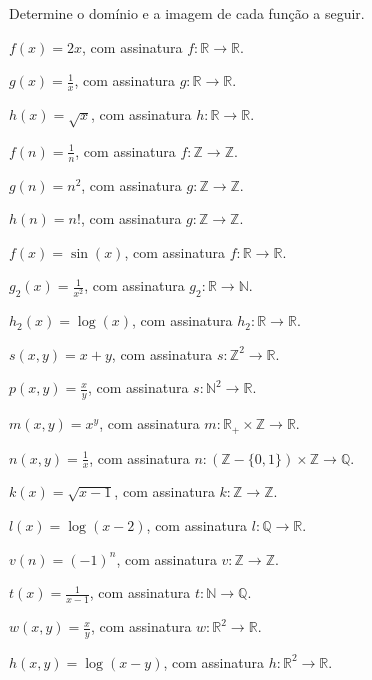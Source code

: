 \begin{questao}\label{prob:Funcao3}
	Determine o domínio e a imagem de cada função a seguir.
\end{questao}

\begin{exerList}
	\item $f(x) = 2x$, com assinatura $f: \mathbb{R} \rightarrow \mathbb{R}$.
	\item $g(x) = \displaystyle\frac{1}{x}$, com assinatura $g: \mathbb{R} \rightarrow \mathbb{R}$.
	\item $h(x) = \sqrt{x}$, com assinatura $h: \mathbb{R} \rightarrow \mathbb{R}$.
	\item $f(n) = \displaystyle\frac{1}{n}$,  com assinatura $f: \mathbb{Z} \rightarrow \mathbb{Z}$.
	\item $g(n) = n^2$,  com assinatura $g: \mathbb{Z} \rightarrow \mathbb{Z}$.
	\item $h(n) = n!$, com assinatura $g: \mathbb{Z} \rightarrow \mathbb{Z}$.
	\item $f(x) = \sin(x)$, com assinatura $f: \mathbb{R} \rightarrow \mathbb{R}$.
	\item $g_2(x) = \displaystyle\frac{1}{x^2}$, com assinatura $g_2: \mathbb{R} \rightarrow \mathbb{N}$.
	\item $h_2(x) = \log(x)$, com assinatura $h_2: \mathbb{R} \rightarrow \mathbb{R}$.
	\item $s(x, y) = x + y$, com assinatura $s: \mathbb{Z}^2 \rightarrow \mathbb{R}$.
	\item $p(x, y) = \displaystyle\frac{x}{y}$, com assinatura $s: \mathbb{N}^2 \rightarrow \mathbb{R}$.
	\item $m(x, y) = x^y$, com assinatura $m: \mathbb{R}_+ \times \mathbb{Z} \rightarrow \mathbb{R}$.
	\item $n(x, y) = \displaystyle\frac{1}{x}$,  com assinatura $n: (\mathbb{Z} - \{0,1\}) \times \mathbb{Z} \rightarrow \mathbb{Q}$.
	\item $k(x) = \sqrt{x - 1}$, com assinatura $k: \mathbb{Z} \rightarrow \mathbb{Z}$.
	\item $l(x) = \log(x - 2)$, com assinatura $l: \mathbb{Q} \rightarrow \mathbb{R}$.
	\item $v(n) = (-1)^n$,  com assinatura $v: \mathbb{Z} \rightarrow \mathbb{Z}$.
	\item $t(x) = \displaystyle\frac{1}{x - 1}$, com assinatura $t: \mathbb{N} \rightarrow \mathbb{Q}$.
	\item $w(x, y) = \displaystyle\frac{x}{y}$,  com assinatura $w: \mathbb{R}^2 \rightarrow \mathbb{R}$.
	\item $h(x, y) = \log(x - y)$, com assinatura $h: \mathbb{R}^2 \rightarrow \mathbb{R}$.
\end{exerList}


